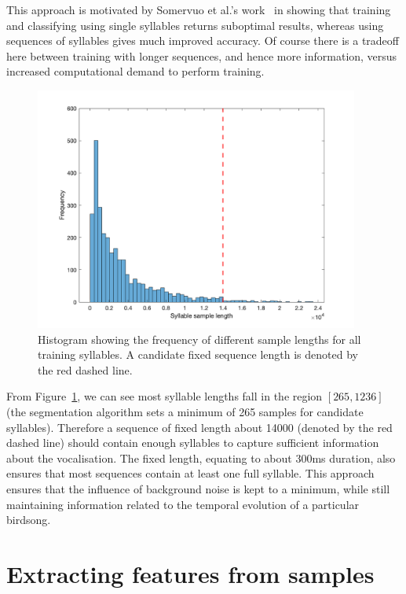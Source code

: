 This approach is motivated by Somervuo et al.'s
work~\cite{somervuo2006parametric} in showing that training and classifying
using single syllables returns suboptimal results, whereas using sequences of
syllables gives much improved accuracy. Of course there is a tradeoff here
between training with longer sequences, and hence more information, versus
increased computational demand to perform training.

\begin{figure}[ht]
  \centering
  \includegraphics[width=0.95\textwidth]{figures/syllable_sample_length.png}
  \caption{Histogram showing the frequency of different sample lengths for all
  training syllables. A candidate fixed sequence length is denoted by the red
dashed line.}\label{fig:syllable_sample_lengths}
\end{figure}

From Figure~\ref{fig:syllable_sample_lengths}, we can see most syllable lengths
fall in the region $\left[ 265, 1236 \right]$ (the segmentation algorithm sets a
minimum of 265 samples for candidate syllables). Therefore a sequence of fixed
length about 14000 (denoted by the red dashed line) should contain enough
syllables to capture sufficient information about the vocalisation. The fixed
length, equating to about 300ms duration, also ensures that most sequences
contain at least one full syllable. This approach ensures that the influence of
background noise is kept to a minimum, while still maintaining information
related to the temporal evolution of a particular birdsong.

\section{Extracting features from samples}\label{sec:method:feat_extraction}

